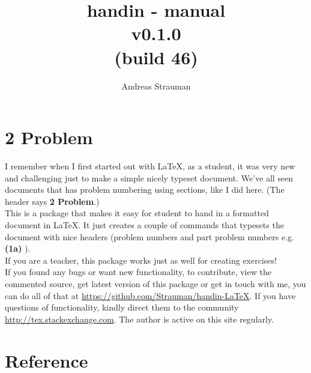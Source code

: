 \documentclass{article}
\title{{handin - manual\\ v0.1.0{\\[-0.5em]\footnotesize(build 46)}}}
\author{Andreas Strauman}
\let\oldsection\section
\gdef\section{\needspace{0.3\paperheight}\oldsection}
\begin{document}
\maketitle
\section*{2 Problem}
I remember when I first started out with LaTeX, as a student, it was very new and challenging just to make a simple nicely typeset document. We've all seen documents that has problem numbering using sections, like I did here. (The header says \textbf{2 Problem}.)\\

This is a package that makes it easy for student to hand in a formatted document in LaTeX. It just creates a couple of commands that typesets the document with nice headers (problem numbers and part problem numbers e.g. \textbf{(1a)} ).\\

If you are a teacher, this package works just as well for creating exercises!\\
 
If you found any bugs or want new functionality, to contribute, view the commented source, get latest version of this package or get in touch with me, you can do all of that at \url{https://github.com/Strauman/handin-LaTeX}. If you have questions of functionality, kindly direct them to the community\\ \url{http://tex.stackexchange.com}. The author is active on this site regularly.

\tableofcontents
\clearpage
 \section{Reference}
\end{document}

